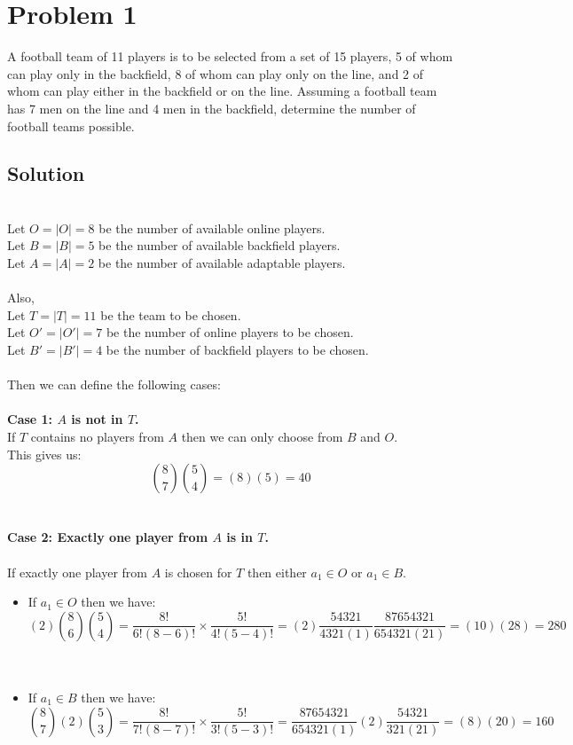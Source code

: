 \documentclass{article}
\begin{document}
 
\section*{Problem 1}
 A football team of 11 players is to be selected from a set of 15 players, 5 of whom can play only in the backfield, 8 of whom can play only on the line, and 2 of whom can play either in the backfield or on the line. Assuming a football team has 7 men on the line and 4 men in the backfield, determine the number of football teams possible.
    
 	\subsection*{Solution}
     \\
     Let ${O} = |O| = 8$ be the number of available online players. \\
     Let ${B} = |B| = 5$ be the number of available backfield players. \\
     Let ${A} = |A| = 2$ be the number of available adaptable players. \\
     \\
     Also, \\
 	Let ${T} = |T| = 11$ be the team to be chosen. \\
     Let ${O'} = |O'| = 7$ be the number of online players to be chosen. \\
     Let ${B'} = |B'| = 4$ be the number of backfield players to be chosen. \\
     \\
     Then we can define the following cases: 
     \\ \\
     \textbf{Case 1: ${A}$ is not in ${T}$.}
     \\
     If ${T}$ contains no players from ${A}$ then we can only choose from ${B}$ and ${O}$. \\ 
     This gives us: \\
     $$\binom{8}{7} \binom{5}{4} = (8)(5) = 40$$
     \\ \\
     \textbf{Case 2: Exactly one player from ${A}$ is in ${T}$.}
     \\ \\
     If exactly one player from ${A}$ is chosen for ${T}$ then either $a_{1} \in {O}$ or $a_{1} \in {B}$. \\
     \begin{itemize}
         \item If $a_{1} \in {O}$ then we have: \\
     $$(2) \binom{8}{6} \binom{5}{4} = \frac{8!}{6!(8-6)!} \times \frac{5!}{4!(5-4)!} = (2) \frac{54321}{4321(1)} \frac{87654321}{654321(21)} = (10)(28) = 280$$
     \\ \\
         \item If $a_{1} \in {B}$ then we have: \\
      $$\binom{8}{7} (2) \binom{5}{3} = \frac{8!}{7!(8-7)!} \times \frac{5!}{3!(5-3)!} = \frac{87654321}{654321(1)} (2) \frac{54321}{321(21)} = (8)(20) = 160$$
     \end{itemize}
\end{document}
